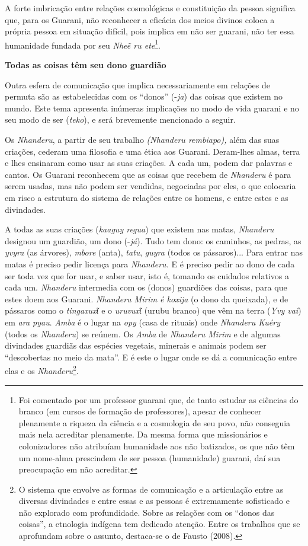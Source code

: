 A forte imbricação entre relações cosmológicas e constituição da pessoa
significa que, para os Guarani, não reconhecer a eficácia dos meios
divinos coloca a própria pessoa em situação difícil, pois implica em não
ser guarani, não ter essa humanidade fundada por seu \emph{Nheẽ ru
ete}\footnote{Foi comentado por um professor guarani que, de tanto
  estudar as ciências do branco (em cursos de formação de professores),
  apesar de conhecer plenamente a riqueza da ciência e a cosmologia de
  seu povo, não conseguia mais nela acreditar plenamente. Da mesma forma
  que missionários e colonizadores não atribuíam humanidade aos não
  batizados, os que não têm um nome-alma prescindem de ser pessoa
  (humanidade) guarani, daí sua preocupação em não acreditar.}.

\textbf{Todas as coisas têm seu dono guardião}

Outra esfera de comunicação que implica necessariamente em relações de
permuta são as estabelecidas com os ``donos'' (-\emph{ja}) das coisas
que existem no mundo. Este tema apresenta inúmeras implicações no modo
de vida guarani e no seu modo de ser (\emph{teko}), e será brevemente
mencionado a seguir.

Os \emph{Nhanderu}, a partir de seu trabalho \emph{(Nhanderu rembiapo),}
além das suas criações, cederam uma filosofia e uma ética aos Guarani.
Deram-lhes almas, terra e lhes ensinaram como usar as suas criações. A
cada um, podem dar palavras e cantos. Os Guarani reconhecem que as
coisas que recebem de \emph{Nhanderu} é para serem usadas, mas não podem
ser vendidas, negociadas por eles, o que colocaria em risco a estrutura
do sistema de relações entre os homens, e entre estes e as divindades.

A todas as suas criações (\emph{kaaguy regua}) que existem nas matas,
\emph{Nhanderu} designou um guardião, um dono (-\emph{já}). Tudo tem
dono: os caminhos, as pedras, as \emph{yvyra} (as árvores), \emph{mbore}
(anta), \emph{tatu}, \emph{guyra} (todos os pássaros)... Para entrar nas
matas é preciso pedir licença para \emph{Nhanderu.} E é preciso pedir ao
dono de cada ser toda vez que for usar, e saber usar, isto é, tomando os
cuidados relativos a cada um. \emph{Nhanderu} intermedia com os (donos)
guardiões das coisas, para que estes doem aos Guarani. \emph{Nhanderu
Mirim é koxija} (o dono da queixada), e de pássaros como o
\emph{tingaxuxῖ} e o \emph{uruvuxῖ} (urubu branco) que vêm na terra
(\emph{Yvy vai}) em \emph{ara pyau}. \emph{Amba} é o lugar na \emph{opy}
(casa de rituais) onde \emph{Nhanderu Kuéry} (todos os \emph{Nhanderu})
se reúnem. Os \emph{Amba} de \emph{Nhanderu Mirim} e de algumas
divindades guardiãs das espécies vegetais, minerais e animais podem ser
``descobertas no meio da mata''. E é este o lugar onde se dá a
comunicação entre elas e os \emph{Nhanderu}\footnote{O sistema que
  envolve as formas de comunicação e a articulação entre as diversas
  divindades e entre essas e as pessoas é extremamente sofisticado e não
  explorado com profundidade. Sobre as relações com os ``donos das
  coisas'', a etnologia indígena tem dedicado atenção. Entre os
  trabalhos que se aprofundam sobre o assunto, destaca-se o de Fausto
  (2008).}.

